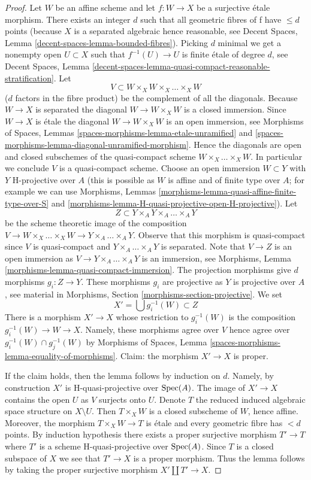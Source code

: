\begin{proof}
Let $W$ be an affine scheme and let $f : W \to X$ be a surjective
\'etale morphism. There exists an integer $d$ such that all geometric
fibres of f have $\leq d$ points (because $X$ is a separated algebraic
hence reasonable, see
Decent Spaces, Lemma \ref{decent-spaces-lemma-bounded-fibres}).
Picking $d$ minimal we get a nonempty open $U \subset X$ such that
$f^{-1}(U) \to U$ is finite \'etale of degree $d$, see
Decent Spaces, Lemma
\ref{decent-spaces-lemma-quasi-compact-reasonable-stratification}.
Let
$$
V \subset W \times_X W \times_X \ldots \times_X W
$$
($d$ factors in the fibre product) be the complement of all the diagonals.
Because $W \to X$ is separated the diagonal $W \to W \times_X W$ is a
closed immersion. Since $W \to X$ is \'etale the diagonal
$W \to W \times_X W$ is an open immersion, see
Morphisms of Spaces, Lemmas
\ref{spaces-morphisms-lemma-etale-unramified} and
\ref{spaces-morphisms-lemma-diagonal-unramified-morphism}.
Hence the diagonals are open and closed subschemes
of the quasi-compact scheme $W \times_X \ldots \times_X W$.
In particular we conclude $V$ is a quasi-compact scheme.
Choose an open immersion $W \subset Y$ with $Y$ H-projective over
$A$ (this is possible as $W$ is affine and of finite type over $A$;
for example we can use
Morphisms, Lemmas
\ref{morphisms-lemma-quasi-affine-finite-type-over-S} and
\ref{morphisms-lemma-H-quasi-projective-open-H-projective}).
Let
$$
Z \subset Y \times_A Y \times_A \ldots \times_A Y
$$
be the scheme theoretic image of the composition
$V \to W \times_X \ldots \times_X W \to Y \times_A \ldots \times_A Y$.
Observe that this morphism is quasi-compact since $V$ is quasi-compact
and $Y \times_A \ldots \times_A Y$ is separated.
Note that $V \to Z$ is an open immersion as
$V \to Y \times_A \ldots \times_A Y$ is an immersion, see
Morphisms, Lemma \ref{morphisms-lemma-quasi-compact-immersion}.
The projection morphisms give $d$ morphisms $g_i : Z \to Y$.
These morphisms $g_i$ are projective as $Y$ is projective over $A$, see
material in Morphisms, Section \ref{morphisms-section-projective}.
We set
$$
X' = \bigcup g_i^{-1}(W) \subset Z
$$
There is a morphism $X' \to X$ whose restriction to $g_i^{-1}(W)$ is
the composition $g_i^{-1}(W) \to W \to X$.
Namely, these morphisms agree over $V$ hence agree over
$g_i^{-1}(W) \cap g_j^{-1}(W)$ by
Morphisms of Spaces, Lemma \ref{spaces-morphisms-lemma-equality-of-morphisms}.
Claim: the morphism $X' \to X$ is proper.

\medskip\noindent
If the claim holds, then the lemma follows by induction on $d$.
Namely, by construction $X'$ is H-quasi-projective over $\operatorname{Spec}(A)$.
The image of $X' \to X$ contains the open $U$ as $V$ surjects onto $U$.
Denote $T$ the reduced induced algebraic space structure on $X \setminus U$.
Then $T \times_X W$ is a closed subscheme of $W$, hence affine.
Moreover, the morphism $T \times_X W \to T$ is \'etale and every geometric
fibre has $< d$ points. By induction hypothesis there exists a proper
surjective morphism $T' \to T$ where $T'$ is a scheme H-quasi-projective
over $\operatorname{Spec}(A)$. Since $T$ is a closed subspace of $X$ we see that
$T' \to X$ is a proper morphism. Thus the lemma follows by taking the
proper surjective morphism $X' \amalg T' \to X$.


\end{proof}
